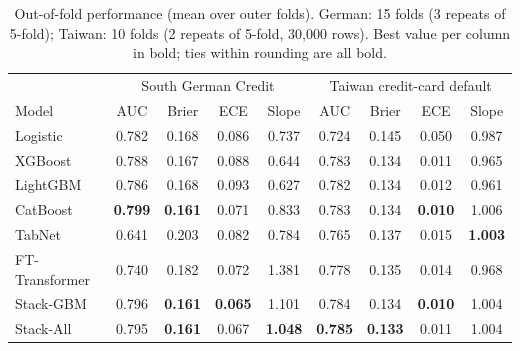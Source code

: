 \begin{table}[t]
\centering
\caption{Out-of-fold performance (mean over outer folds). German: 15 folds (3 repeats of 5-fold); Taiwan: 10 folds (2 repeats of 5-fold, 30,000 rows). Best value per column in bold; ties within rounding are all bold.}
\label{tab:main}
\small
\setlength{\tabcolsep}{3.5pt}
\begin{tabular}{l|cccc|cccc}
\toprule
 & \multicolumn{4}{c|}{South German Credit} & \multicolumn{4}{c}{Taiwan credit-card default}\\
Model & AUC & Brier & ECE & Slope & AUC & Brier & ECE & Slope\\
\midrule
Logistic & 0.782 & 0.168 & 0.086 & 0.737 & 0.724 & 0.145 & 0.050 & 0.987\\
XGBoost & 0.788 & 0.167 & 0.088 & 0.644 & 0.783 & 0.134 & 0.011 & 0.965\\
LightGBM & 0.786 & 0.168 & 0.093 & 0.627 & 0.782 & 0.134 & 0.012 & 0.961\\
CatBoost & \textbf{0.799} & \textbf{0.161} & 0.071 & 0.833 & 0.783 & 0.134 & \textbf{0.010} & 1.006\\
TabNet & 0.641 & 0.203 & 0.082 & 0.784 & 0.765 & 0.137 & 0.015 & \textbf{1.003}\\
FT-Transformer & 0.740 & 0.182 & 0.072 & 1.381 & 0.778 & 0.135 & 0.014 & 0.968\\
\midrule
Stack-GBM & 0.796 & \textbf{0.161} & \textbf{0.065} & 1.101 & 0.784 & 0.134 & \textbf{0.010} & 1.004\\
Stack-All & 0.795 & \textbf{0.161} & 0.067 & \textbf{1.048} & \textbf{0.785} & \textbf{0.133} & 0.011 & 1.004\\
\bottomrule
\end{tabular}
\end{table}